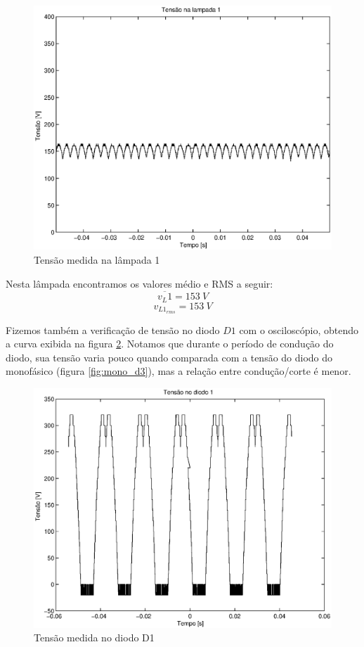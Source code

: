 \documentclass{report}
\begin{document}
\begin{figure}[H]
	\centering
	\includegraphics[width=\linewidth]{dados/trifasico/tri_l1}
	\caption{Tensão medida na lâmpada 1}
	\label{fig:tri_l1}
\end{figure}

Nesta lâmpada encontramos os valores médio e RMS a seguir:
\begin{equation}
\overline{v_L1} = 153\ V
\end{equation}
\begin{equation}
v_{L1_{rms}} = 153\ V
\end{equation}

Fizemos também a verificação de tensão no diodo $D1$ com o osciloscópio, obtendo a curva exibida na figura \ref{fig:tri_d1}. Notamos que durante o período de condução do diodo, sua tensão varia pouco quando comparada com a tensão do diodo do monofásico (figura \ref{fig:mono_d3}), mas a relação entre condução/corte é menor.

\begin{figure}[H]
	\centering
	\includegraphics[width=\linewidth]{dados/trifasico/tri_d1}
	\caption{Tensão medida no diodo D1}
	\label{fig:tri_d1}
\end{figure}
\end{document}
